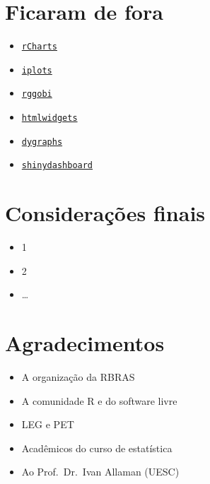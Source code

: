 \section{Ficaram de fora}

\begin{frame}

  \begin{itemize}
  \item 
	\href{http://ramnathv.github.io/rCharts/}{\texttt{rCharts}}
  \item
    \href{http://cran.r-project.org/web/packages/iplots/index.html}{\texttt{iplots}}
  \item
    \href{http://cran.r-project.org/web/packages/rggobi/index.html}{\texttt{rggobi}}
  \item
    \href{http://www.htmlwidgets.org/index.html}{\texttt{htmlwidgets}}
  \item
    \href{https://rstudio.github.io/dygraphs/index.html}{\texttt{dygraphs}}
  \item
    \href{http://rstudio.github.io/shinydashboard/index.html}{\texttt{shinydashboard}}
  \end{itemize}

\end{frame}

\section{Considerações finais}

\begin{frame}

  \begin{itemize}
  \item 1
  \item 2
  \item \ldots{}
  \end{itemize}

\end{frame}

\section{Agradecimentos}

\begin{frame}

  \begin{itemize}
  \item A organização da RBRAS
  \item A comunidade R e do software livre
  \item LEG e PET
  \item Acadêmicos do curso de estatística
  \item Ao Prof.~Dr.~Ivan Allaman (UESC)
  \end{itemize}

\end{frame}
